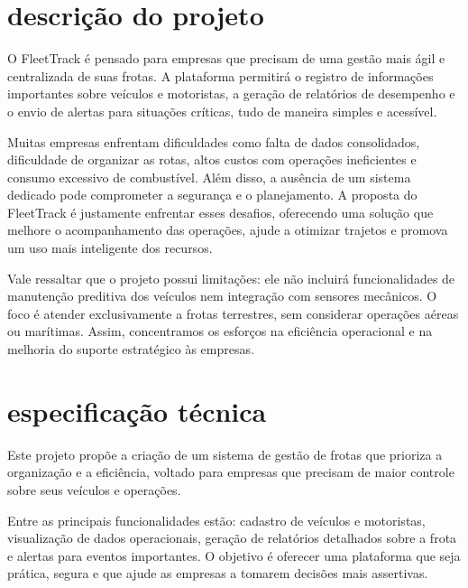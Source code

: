 \documentclass[12pt]{article}
\begin{document}
\newpage

\section{descrição do projeto}

O FleetTrack é pensado para empresas que precisam de uma gestão mais ágil e centralizada de suas frotas. A plataforma permitirá o registro de informações importantes sobre veículos e motoristas, a geração de relatórios de desempenho e o envio de alertas para situações críticas, tudo de maneira simples e acessível.

Muitas empresas enfrentam dificuldades como falta de dados consolidados, dificuldade de organizar as rotas, altos custos com operações ineficientes e consumo excessivo de combustível. Além disso, a ausência de um sistema dedicado pode comprometer a segurança e o planejamento. A proposta do FleetTrack é justamente enfrentar esses desafios, oferecendo uma solução que melhore o acompanhamento das operações, ajude a otimizar trajetos e promova um uso mais inteligente dos recursos.

Vale ressaltar que o projeto possui limitações: ele não incluirá funcionalidades de manutenção preditiva dos veículos nem integração com sensores mecânicos. O foco é atender exclusivamente a frotas terrestres, sem considerar operações aéreas ou marítimas. Assim, concentramos os esforços na eficiência operacional e na melhoria do suporte estratégico às empresas.

\newpage

\section{especificação técnica}

Este projeto propõe a criação de um sistema de gestão de frotas que prioriza a organização e a eficiência, voltado para empresas que precisam de maior controle sobre seus veículos e operações.

Entre as principais funcionalidades estão: cadastro de veículos e motoristas, visualização de dados operacionais, geração de relatórios detalhados sobre a frota e alertas para eventos importantes. O objetivo é oferecer uma plataforma que seja prática, segura e que ajude as empresas a tomarem decisões mais assertivas.
\end{document}
